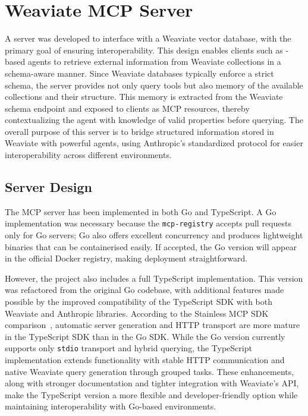 \section{Weaviate MCP Server}

A  server was developed to interface with a Weaviate vector database, with the primary goal of ensuring interoperability. This design enables clients such as -based agents to retrieve external information from Weaviate collections in a schema-aware manner. Since Weaviate databases typically enforce a strict schema, the server provides not only query tools but also memory of the available collections and their structure. This memory is extracted from the Weaviate schema endpoint and exposed to clients as MCP resources, thereby contextualizing the agent with knowledge of valid properties before querying. The overall purpose of this server is to bridge structured information stored in Weaviate with powerful  agents, using Anthropic’s standardized protocol for easier interoperability across different environments.

\subsection{Server Design}

The MCP server has been implemented in both Go and TypeScript. A Go implementation was necessary because the \texttt{mcp-registry} accepts pull requests only for Go servers; Go also offers excellent concurrency and produces lightweight binaries that can be containerised easily. If accepted, the Go version will appear in the official Docker registry, making deployment straightforward.

However, the project also includes a full TypeScript implementation. This version was refactored from the original Go codebase, with additional features made possible by the improved compatibility of the TypeScript SDK with both Weaviate and Anthropic libraries. According to the Stainless MCP SDK comparison~\cite{stainless_mcp_comparison}, automatic server generation and HTTP transport are more mature in the TypeScript SDK than in the Go SDK. While the Go version currently supports only \texttt{stdio} transport and hybrid querying, the TypeScript implementation extends functionality with stable HTTP communication and native Weaviate query generation through grouped tasks. These enhancements, along with stronger documentation and tighter integration with Weaviate’s API, make the TypeScript version a more flexible and developer-friendly option while maintaining interoperability with Go-based environments.

